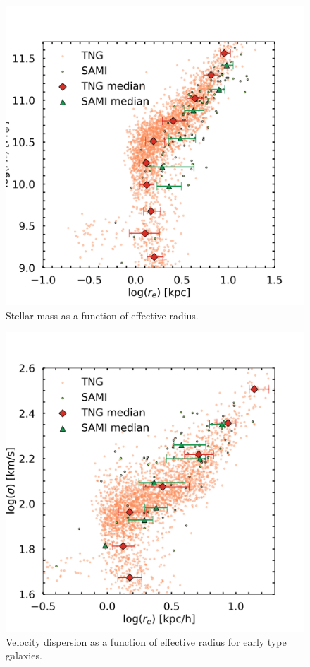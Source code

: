 \begin{figure}
    \centering
    \includegraphics[width=\textwidth]{images/results_mass_radius_FP.png}
    \caption{Stellar mass as a function of effective radius.}
    \label{FP_res1}
\end{figure}

\begin{figure}
    \centering
    \includegraphics[width=\textwidth]{images/results_sigma_radius_FP.png}
    \caption{Velocity dispersion as a function of effective radius for early type galaxies.}
    \label{FP_res2}
\end{figure}

